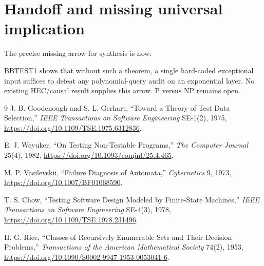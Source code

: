 \documentclass[11pt]{article}
\begin{document}
\section{Handoff and missing universal implication}

The precise missing arrow for synthesis is now:
\begin{center}
\end{center}
BBTEST1 shows that without such a theorem, a single hard-coded exceptional input suffices to defeat any polynomial-query audit on an exponential layer.  No existing HEC/causal result supplies this arrow.  P versus NP remains open.

\begin{thebibliography}{9}
J. B. Goodenough and S. L. Gerhart,
``Toward a Theory of Test Data Selection,''
\emph{IEEE Transactions on Software Engineering} SE-1(2), 1975,
\url{https://doi.org/10.1109/TSE.1975.6312836}.

E. J. Weyuker,
``On Testing Non-Testable Programs,''
\emph{The Computer Journal} 25(4), 1982,
\url{https://doi.org/10.1093/comjnl/25.4.465}.

M. P. Vasilevskii,
``Failure Diagnosis of Automata,''
\emph{Cybernetics} 9, 1973,
\url{https://doi.org/10.1007/BF01068590}.

T. S. Chow,
``Testing Software Design Modeled by Finite-State Machines,''
\emph{IEEE Transactions on Software Engineering} SE-4(3), 1978,
\url{https://doi.org/10.1109/TSE.1978.231496}.

H. G. Rice,
``Classes of Recursively Enumerable Sets and Their Decision Problems,''
\emph{Transactions of the American Mathematical Society} 74(2), 1953,
\url{https://doi.org/10.1090/S0002-9947-1953-0053041-6}.
\end{thebibliography}

\end{document}

